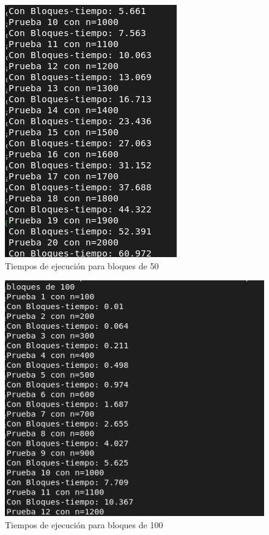 \documentclass{article}
\begin{document}
\begin{enumerate}
\begin{figure}[h!]
    \centering
   \includegraphics[width=0.5\linewidth]{imagenes/Captura de pantalla de 2023-09-24 20-52-17.png}
   \caption{Tiempos de ejecución para bloques de 50}
   \label{fig:figura4}
\end{figure}



\begin{figure}[h!]
    \centering
   \includegraphics[width=0.5\linewidth]{imagenes/Captura de pantalla de 2023-09-24 20-48-57.png}
   \caption{Tiempos de ejecución para bloques de 100}
   \label{fig:figura5}
\end{figure}



\end{enumerate}
\end{document}
